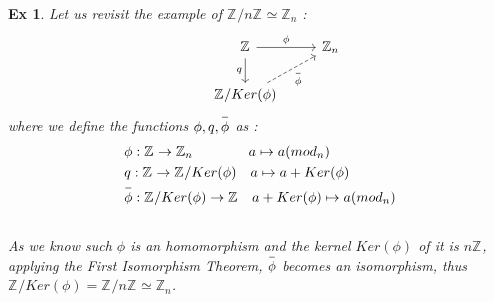 \documentclass[paper=a4, fontsize=11pt]{scrartcl}
\newcommand{\Zn}[1]{\mathbb{Z}_{#1}}
\newcommand{\overbar}[1]{
	\mkern 1.5mu \overline{\mkern-1.5mu\raisebox{0pt}[\dimexpr\height+0.5mm\relax]{$#1$}\mkern-1.5mu}\mkern 1.5mu
}
\newtheorem{example}{Ex}
\begin{document}
\begin{example}
	Let us revisit the example of $\Zn{}/ n\Zn{} \simeq \Zn{n}$ : 
	\vspace{0.1in}
	\[
	\begin{tikzcd}	
	& \Zn{} \arrow{d}[swap]{q} \arrow[r,"\phi"] & \Zn{n} \\
	& \Zn{}/Ker(\phi) \arrow[dashrightarrow]{ru}[swap]{\overbar{\phi}}
	\end{tikzcd}	
	\]
		\vspace{0.1in}
	where we define the functions $\phi,q,\overbar{\phi}$ as :\\
	\begin{equation}\nonumber
		\begin{split}
		 &\phi : \Zn{} \to \Zn{n} \quad \quad\quad\quad a \mapsto a (mod_n)\\
		 &q : \Zn{} \to \Zn{}/Ker(\phi) \quad a \mapsto a + Ker(\phi) \\
		 &\overbar{\phi} : \Zn{}/Ker(\phi)  \to \Zn{}  \quad a+Ker(\phi) \mapsto a (mod_n)
		\end{split}
	\end{equation}\\
	As we know such $\phi$ is an homomorphism and the kernel $Ker(\phi)$ of it is $n\Zn{}$, applying the First Isomorphism Theorem, $\overbar{\phi}$ becomes an isomorphism, thus $\Zn{} / Ker(\phi) = \Zn{ }/ n \Zn{} \simeq \Zn{n}$.
\end{example}
\end{document}

